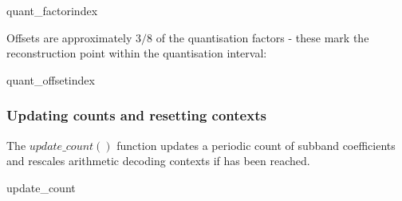 \begin{pseudo}{quant\_factor}{index}
\bsEND
\end{pseudo}

Offsets are approximately $3/8$ of the quantisation factors - these
mark the reconstruction point within the quantisation interval:

\begin{pseudo}{quant\_offset}{index}
\end{pseudo}

\subsubsection{Updating counts and resetting contexts}
\label{updatecounts}

The $update\_count()$ function updates a periodic count of subband 
coefficients and rescales arithmetic decoding contexts if \CoefficientReset has been reached.

\begin{pseudo}{update\_count}{}
\bsIF{\CoefficientCount == \CoefficientReset}
  \bsEND
\bsEND
\end{pseudo}


